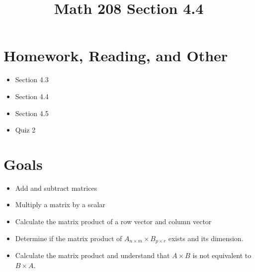 \documentclass[14pt]{extarticle}
\title{\vspace{-5ex}Math 208 Section 4.4}
\date{\vspace{-10ex}}
\begin{document}
\maketitle		
\section*{Homework, Reading, and Other}
\begin{itemize}
	\item Section 4.3
	\item Section 4.4
	\item Section 4.5
	\item Quiz 2
\end{itemize}

\section*{Goals}
\begin{itemize}
	\item Add and subtract matrices
	\item Multiply a matrix by a scalar
	\item Calculate the matrix product of a row vector and column vector
	\item Determine if the matrix product of $A_{n\times m} \times B_{p\times r}$ exists and its dimension.
	\item Calculate the matrix product and understand that $A\times B$ is not equivalent to $B\times A$.
\end{itemize}
\end{document}
